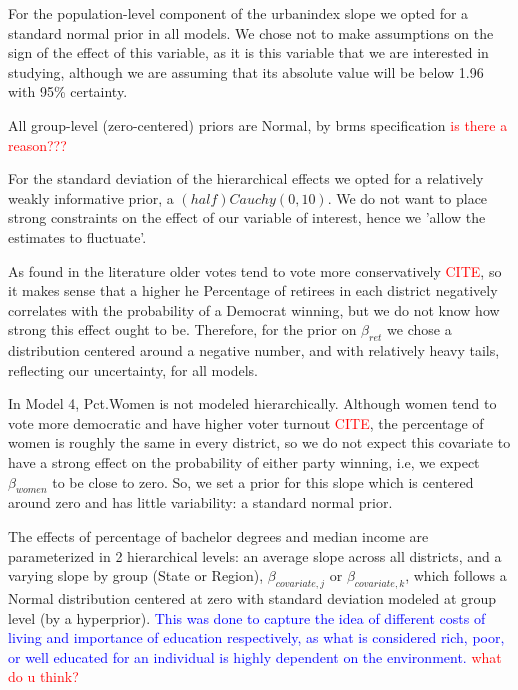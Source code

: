 \documentclass[12pt]{article}
\newcommand{\red}[1]{\textcolor{red}{#1}}
\newcommand{\blue}[1]{\textcolor{blue}{#1}}
\begin{document}
For the population-level component of the urbanindex slope we opted for a standard normal prior in all models. We chose not to make assumptions on the sign of the effect of this variable, as it is this variable that we are interested in studying, although we are assuming that its absolute value will be below 1.96 with 95\% certainty. 

All group-level (zero-centered) priors are Normal, by brms specification \textcolor{red}{is there a reason???}

For the standard deviation of the hierarchical effects we opted for a relatively weakly informative prior, a $(half)Cauchy(0,10)$.
We do not want to place strong constraints on the effect of our variable of interest, hence we 'allow the estimates to fluctuate'.



As found in the literature older votes tend to vote more conservatively \red{CITE}, so it makes sense that a higher he Percentage of retirees in each district negatively correlates with the probability of a Democrat winning, but we do not know how strong this effect ought to be. Therefore, for the prior on $\beta_{ret}$ we chose a distribution centered around a negative number, and with relatively heavy tails, reflecting our uncertainty, for all models. 



In Model 4, Pct.Women is not modeled hierarchically.
Although women tend to vote more democratic and have higher voter turnout \red{CITE}, the percentage of women is roughly the same in every district, so we do not expect this covariate to have a strong effect on the probability of either party winning, i.e, we expect $\beta_{women}$ to be close to zero. So, we set a prior for this slope which is centered around zero and has little variability: a standard normal prior. 



The effects of percentage of bachelor degrees and median income are parameterized in 2 hierarchical levels: an average slope across all districts, and a varying slope by group (State or Region), $\beta_{covariate,j}$ or $\beta_{covariate,k}$, which follows a Normal distribution centered at zero with standard deviation modeled at group level (by a hyperprior). \blue{This was done to capture the idea of different costs of living and importance of education respectively, as what is considered rich, poor, or well educated for an individual is highly dependent on the environment. }\red{what do u think?}
\end{document}

